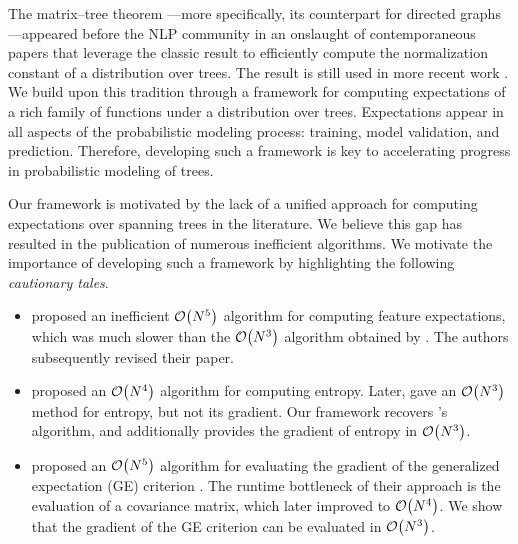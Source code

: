 \documentclass[11pt,a4paper]{article}
\theoremstyle{definition}
\begin{document}
The matrix--tree theorem \citep{kirchhoff}---more specifically, its counterpart for directed graphs \citep{tutte1984graph}---appeared before the NLP community in an onslaught of contemporaneous papers \citep{koo-et-al-2007, mcdonald-satta-2007,smith-smith-2007} that leverage the classic result to efficiently compute the normalization constant of a distribution over trees.
The result is still used in more recent work \citep{ma,liu-lapata-2018-learning}.
We build upon this tradition through a framework for computing expectations of a rich family of functions under a distribution over trees.
Expectations appear in all aspects of the probabilistic modeling process: training, model validation, and prediction.
Therefore, developing such a framework is key to accelerating progress in probabilistic modeling of trees.

Our framework is motivated by the lack of a unified approach for computing expectations over spanning trees in the literature.
We believe this gap has resulted in the publication of numerous inefficient
algorithms.
We motivate the importance of developing such a framework by highlighting the following \emph{cautionary tales}.\label{cautionary-tales}

\begin{itemize}[leftmargin=1em, topsep=1pt, itemsep=1pt, parsep=1pt]

\item \citet{mcdonald-satta-2007} proposed an inefficient $\mathcal{O}\!\left({N}^5\right)$ algorithm for computing feature expectations, which was much slower than the $\mathcal{O}\!\left({N}^3\right)$ algorithm obtained by \citet{koo-et-al-2007, smith-smith-2007}. The authors subsequently revised their paper.

\item \citet{smith-eisner-2007} proposed an $\mathcal{O}\!\left({N}^4\right)$ algorithm for computing entropy.  Later, \citet{martins-etal-2010-turbo} gave an $\mathcal{O}\!\left({N}^3\right)$ method for entropy, but not its gradient.  Our framework recovers \citet{martins-etal-2010-turbo}'s algorithm, and additionally provides the gradient of entropy in $\mathcal{O}\!\left({N}^3\right)$.
\item \citet{druck-etal-2009-semi} proposed an $\mathcal{O}\!\left({N}^5\right)$ algorithm for evaluating the gradient of the generalized expectation (GE) criterion \citep{mccallum2007generalized}.
The runtime bottleneck of their approach is the evaluation of a covariance matrix, which \citet{druck09covariance} later improved to $\mathcal{O}\!\left({N}^4\right)$.
We show that the gradient of the GE criterion can be evaluated in $\mathcal{O}\!\left({N}^3\right)$.
\end{itemize}
\end{document}
